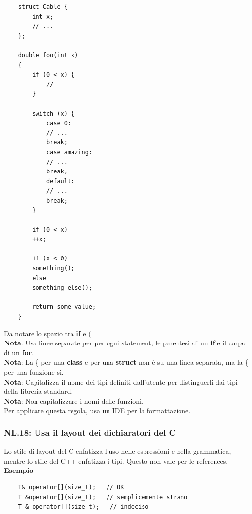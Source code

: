 \begin{lstlisting}
	struct Cable {
		int x;
		// ...
	};
	
	double foo(int x)
	{
		if (0 < x) {
			// ...
		}
		
		switch (x) {
			case 0:
			// ...
			break;
			case amazing:
			// ...
			break;
			default:
			// ...
			break;
		}
		
		if (0 < x)
		++x;
		
		if (x < 0)
		something();
		else
		something_else();
		
		return some_value;
	}
\end{lstlisting}

\textsf{\small Da notare lo spazio tra \textbf{if} e \textbf{$($}} \\

\textsf{\small \textbf{Nota}: Usa linee separate per per ogni statement, le parentesi di un \textbf{if} e il corpo di un \textbf{for}.} \\

\textsf{\small \textbf{Nota}: La \{ per una \textbf{class} e per una \textbf{struct} non è su una linea separata, ma la \{ per una funzione sì.} \\

\textsf{\small \textbf{Nota}: Capitalizza il nome dei tipi definiti dall'utente per distinguerli dai tipi della libreria standard.} \\

\textsf{\small \textbf{Nota}: Non capitalizzare i nomi delle funzioni.} \\

\textsf{\small Per applicare questa regola, usa un IDE per la formattazione.} \\

\subsubsection{NL.18: Usa il layout dei dichiaratori del C}

\textsf{\small Lo stile di layout del C enfatizza l'uso nelle espressioni e nella grammatica, mentre lo stile del C++ enfatizza i tipi. Questo non vale per le references.} \\ %

\textsf{\small \textbf{Esempio}} 

\begin{lstlisting}
	T& operator[](size_t);   // OK
	T &operator[](size_t);   // semplicemente strano
	T & operator[](size_t);   // indeciso
\end{lstlisting}

